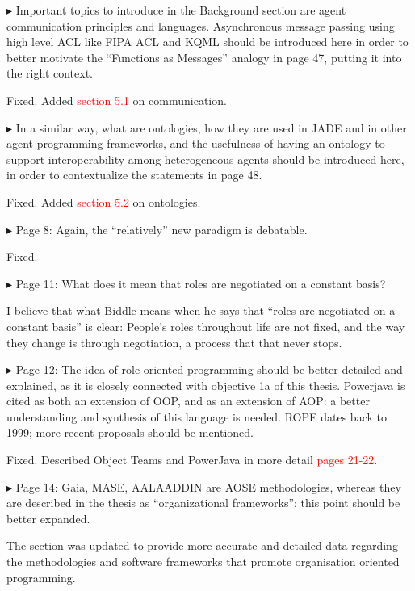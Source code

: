 \documentclass{article}
\newcommand*\R[1]{\textcolor{red}{#1}} %
\newenvironment{them}%
  {\bigskip\noindent\begingroup\color{blue}$\blacktriangleright$\enspace}%
  {\endgroup\par}
\begin{document}
\begin{them}
Important topics to introduce in the Background section are agent communication
principles and languages. Asynchronous message passing using high level ACL
like FIPA ACL and KQML should be introduced here in order to better motivate
the ``Functions as Messages'' analogy in page 47, putting it into the right
context.
\end{them}
Fixed. Added \R{section 5.1} on communication.

\begin{them}
In a similar way, what are ontologies, how they are used in JADE and in other
agent programming frameworks, and the usefulness of having an ontology to
support interoperability among heterogeneous agents should be introduced here,
in order to contextualize the statements in page 48.
\end{them}
Fixed. Added \R{section 5.2} on ontologies.

\begin{them}
Page 8:
Again, the ``relatively'' new paradigm is debatable.
\end{them}
Fixed. 

\begin{them}
Page 11:
What does it mean that roles are negotiated on a constant basis?
\end{them}

I believe that what Biddle means when he says that ``roles are negotiated on
a constant basis'' is clear: People's roles throughout life are not fixed,
and the way they change is through negotiation, a process that that never
stops.


\begin{them}
Page 12:
The idea of role oriented programming should be better detailed and explained,
as it is closely connected with objective 1a of this thesis. Powerjava is cited
as both an extension of OOP, and as an extension of AOP: a better understanding
and synthesis of this language is needed. ROPE dates back to 1999; more recent
proposals should be mentioned.
\end{them}
Fixed. Described Object Teams and PowerJava in more detail \R{pages 21-22}.

\begin{them}
Page 14:
Gaia, MASE, AALAADDIN are AOSE methodologies, whereas they are described in the
thesis as ``organizational frameworks''; this point should be better expanded.
\end{them}
The section was updated to provide more accurate and detailed data regarding
the methodologies and software frameworks that promote organisation oriented
programming.
\end{document}
